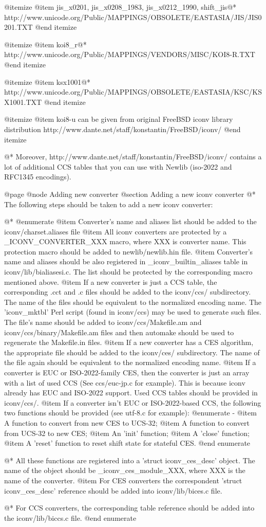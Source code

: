 @itemize
@item
jis_x0201, jis_x0208_1983, jis_x0212_1990, shift_jis@*
http://www.unicode.org/Public/MAPPINGS/OBSOLETE/EASTASIA/JIS/JIS0201.TXT
@end itemize

@itemize
@item
koi8_r@*
http://www.unicode.org/Public/MAPPINGS/VENDORS/MISC/KOI8-R.TXT
@end itemize

@itemize
@item
ksx1001@*
http://www.unicode.org/Public/MAPPINGS/OBSOLETE/EASTASIA/KSC/KSX1001.TXT
@end itemize

@itemize
@item
koi8-u can be given from original FreeBSD iconv library distribution
http://www.dante.net/staff/konstantin/FreeBSD/iconv/
@end itemize

@*
Moreover, http://www.dante.net/staff/konstantin/FreeBSD/iconv/ contains a 
lot of additional CCS tables that you can use with Newlib (iso-2022 and
RFC1345 encodings).

@page
@node Adding new converter
@section Adding a new iconv converter
@*
The following steps should be taken to add a new iconv converter:
 
@*
@enumerate
@item
Converter's name and aliases list should be added to 
the iconv/charset.aliases file
@item
All iconv converters are protected by a _ICONV_CONVERTER_XXX
macro, where XXX is converter name.  This protection macro should be added to
newlib/newlib.hin file.
@item
Converter's name and aliases should be also registered in _iconv_builtin_aliases
table in iconv/lib/bialiasesi.c.  The list should be protected by
the corresponding macro mentioned above.
@item
If a new converter is just a CCS table, the corresponding .cct and .c files
should be added to the iconv/ccs/ subdirectory. The name of the files 
should be equivalent to the normalized encoding name.  The 'iconv_mktbl' 
Perl script (found in iconv/ccs) may
be used to generate such files.  The file's name should be added to
iconv/ccs/Makefile.am and iconv/ccs/binary/Makefile.am files and then
automake should be used to regenerate the Makefile.in files.
@item
If a new converter has a CES algorithm, the appropriate file should be 
added to the
iconv/ces/ subdirectory.  The name of the file again should be equivalent 
to the normalized
encoding name.
@item
If a converter is EUC or ISO-2022-family CES, then the converter
is just an array with a list of used CCS (See ccs/euc-jp.c for example). This
is because iconv already has EUC and ISO-2022 support.  Used CCS tables should
be provided in iconv/ccs/.
@item
If a converter isn't EUC or ISO-2022-based CCS, the following two functions
should be provided (see utf-8.c for example):
@enumerate -
@item A function to convert from new CES to UCS-32;
@item A function to convert from UCS-32 to new CES;
@item An 'init' function;
@item A 'close' function;
@item A 'reset' function to reset shift state for stateful CES.
@end enumerate

@*
All these functions are registered into a 'struct iconv_ces_desc' object.
The name of the object should be _iconv_ces_module_XXX, where XXX is the
name of the converter.
@item
For CES converters the correspondent 'struct iconv_ces_desc' reference should
be added into iconv/lib/bices.c file.

@*
For CCS converters, the corresponding table reference should be added into
the iconv/lib/biccs.c file.
@end enumerate

